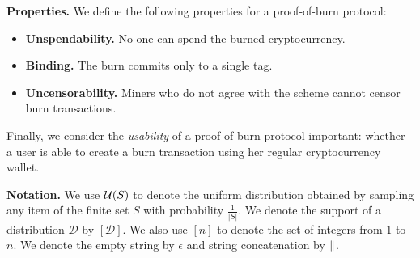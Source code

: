 \noindent
\textbf{Properties.}
We define the following properties for a proof-of-burn protocol:
\begin{itemize}
    \item \textbf{Unspendability.} No one can spend the burned cryptocurrency.
    \item \textbf{Binding.} The burn commits only to a single tag.
    \item \textbf{Uncensorability.} Miners who do not agree with the scheme cannot censor burn transactions.
\end{itemize}

Finally, we consider the \emph{usability} of a proof-of-burn protocol important: whether a user is able to create a burn transaction using her regular cryptocurrency wallet.

\noindent
\textbf{Notation.} We use $\mathcal{U}(S)$ to denote the uniform distribution
obtained by sampling any item of the finite set $S$ with probability $\frac{1}{|S|}$.
We denote the support of a distribution $\mathcal{D}$ by $[\mathcal{D}]$. We also use $[n]$ to denote the set of integers from $1$ to $n$.
We denote the empty string by $\epsilon$ and string concatenation by $\mathbin{\|}$.

